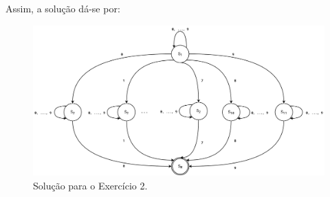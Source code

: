 \documentclass[a4paper, 12pt]{article}
\begin{document}
Assim, a solução dá-se por:

\begin{figure}[!ht]
    \centering
    \includegraphics[width=\linewidth]{./imgs/task-2-2c.pdf}
    \caption{Solução para o Exercício 2.}
    \label{fig:solution_t2_2c}
\end{figure}
\end{document}
